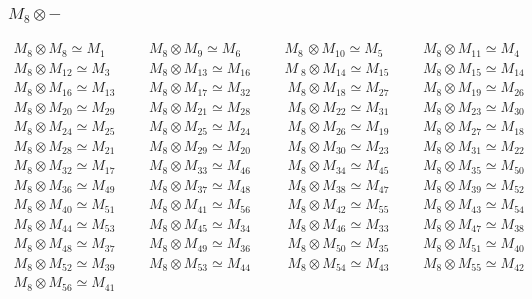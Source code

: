 \subsubsection{$M_8\otimes -$}
\begin{align*}
M_{8} \otimes M_{8} \simeq M_{1} &&& M_{8} \otimes M_{9} \simeq M_{6} &&& M_{8\
} \otimes M_{10} \simeq M_{5} &&& M_{8} \otimes M_{11} \simeq M_{4}\\
M_{8} \otimes M_{12} \simeq M_{3} &&& M_{8} \otimes M_{13} \simeq M_{16} &&& M\
_{8} \otimes M_{14} \simeq M_{15} &&& M_{8} \otimes M_{15} \simeq M_{14}\\
M_{8} \otimes M_{16} \simeq M_{13} &&& M_{8} \otimes M_{17} \simeq M_{32} &&& \
M_{8} \otimes M_{18} \simeq M_{27} &&& M_{8} \otimes M_{19} \simeq M_{26}\\
M_{8} \otimes M_{20} \simeq M_{29} &&& M_{8} \otimes M_{21} \simeq M_{28} &&& \
M_{8} \otimes M_{22} \simeq M_{31} &&& M_{8} \otimes M_{23} \simeq M_{30}\\
M_{8} \otimes M_{24} \simeq M_{25} &&& M_{8} \otimes M_{25} \simeq M_{24} &&& \
M_{8} \otimes M_{26} \simeq M_{19} &&& M_{8} \otimes M_{27} \simeq M_{18}\\
M_{8} \otimes M_{28} \simeq M_{21} &&& M_{8} \otimes M_{29} \simeq M_{20} &&& \
M_{8} \otimes M_{30} \simeq M_{23} &&& M_{8} \otimes M_{31} \simeq M_{22}\\
M_{8} \otimes M_{32} \simeq M_{17} &&& M_{8} \otimes M_{33} \simeq M_{46} &&& \
M_{8} \otimes M_{34} \simeq M_{45} &&& M_{8} \otimes M_{35} \simeq M_{50}\\
M_{8} \otimes M_{36} \simeq M_{49} &&& M_{8} \otimes M_{37} \simeq M_{48} &&& \
M_{8} \otimes M_{38} \simeq M_{47} &&& M_{8} \otimes M_{39} \simeq M_{52}\\
M_{8} \otimes M_{40} \simeq M_{51} &&& M_{8} \otimes M_{41} \simeq M_{56} &&& \
M_{8} \otimes M_{42} \simeq M_{55} &&& M_{8} \otimes M_{43} \simeq M_{54}\\
M_{8} \otimes M_{44} \simeq M_{53} &&& M_{8} \otimes M_{45} \simeq M_{34} &&& \
M_{8} \otimes M_{46} \simeq M_{33} &&& M_{8} \otimes M_{47} \simeq M_{38}\\
M_{8} \otimes M_{48} \simeq M_{37} &&& M_{8} \otimes M_{49} \simeq M_{36} &&& \
M_{8} \otimes M_{50} \simeq M_{35} &&& M_{8} \otimes M_{51} \simeq M_{40}\\
M_{8} \otimes M_{52} \simeq M_{39} &&& M_{8} \otimes M_{53} \simeq M_{44} &&& \
M_{8} \otimes M_{54} \simeq M_{43} &&& M_{8} \otimes M_{55} \simeq M_{42}\\
M_{8} \otimes M_{56} \simeq M_{41}\\
\end{align*}

